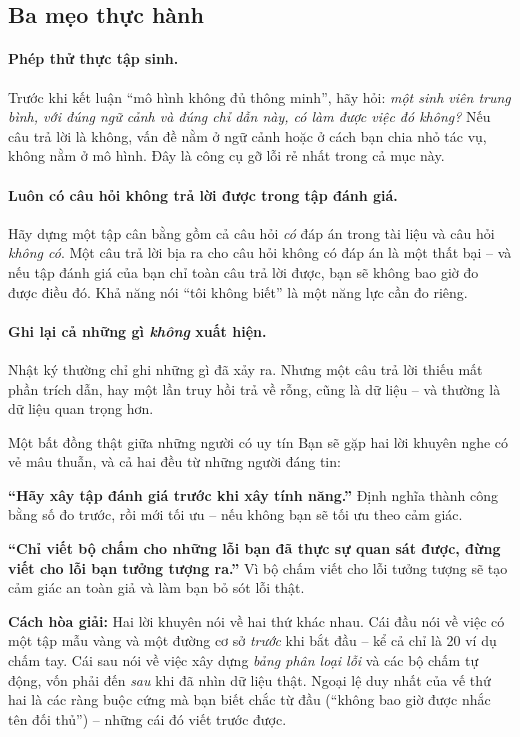 \subsection{Ba mẹo thực hành}
\label{ssec:eval_tips}

\paragraph{Phép thử thực tập sinh.} Trước khi kết luận “mô hình không đủ thông minh”, hãy hỏi: \emph{một sinh viên trung bình, với đúng ngữ cảnh và đúng chỉ dẫn này, có làm được việc đó không?} Nếu câu trả lời là không, vấn đề nằm ở ngữ cảnh hoặc ở cách bạn chia nhỏ tác vụ, không nằm ở mô hình. Đây là công cụ gỡ lỗi rẻ nhất trong cả mục này.

\paragraph{Luôn có câu hỏi không trả lời được trong tập đánh giá.} Hãy dựng một tập cân bằng gồm cả câu hỏi \emph{có} đáp án trong tài liệu và câu hỏi \emph{không có}. Một câu trả lời bịa ra cho câu hỏi không có đáp án là một thất bại -- và nếu tập đánh giá của bạn chỉ toàn câu trả lời được, bạn sẽ không bao giờ đo được điều đó. Khả năng nói “tôi không biết” là một năng lực cần đo riêng.

\paragraph{Ghi lại cả những gì \emph{không} xuất hiện.} Nhật ký thường chỉ ghi những gì đã xảy ra. Nhưng một câu trả lời thiếu mất phần trích dẫn, hay một lần truy hồi trả về rỗng, cũng là dữ liệu -- và thường là dữ liệu quan trọng hơn.

\begin{pitfall}{Một bất đồng thật giữa những người có uy tín}
Bạn sẽ gặp hai lời khuyên nghe có vẻ mâu thuẫn, và cả hai đều từ những người đáng tin:

\textbf{“Hãy xây tập đánh giá trước khi xây tính năng.”} Định nghĩa thành công bằng số đo trước, rồi mới tối ưu -- nếu không bạn sẽ tối ưu theo cảm giác.

\textbf{“Chỉ viết bộ chấm cho những lỗi bạn đã thực sự quan sát được, đừng viết cho lỗi bạn tưởng tượng ra.”} Vì bộ chấm viết cho lỗi tưởng tượng sẽ tạo cảm giác an toàn giả và làm bạn bỏ sót lỗi thật.

\textbf{Cách hòa giải:} Hai lời khuyên nói về hai thứ khác nhau. Cái đầu nói về việc có một tập mẫu vàng và một đường cơ sở \emph{trước} khi bắt đầu -- kể cả chỉ là 20 ví dụ chấm tay. Cái sau nói về việc xây dựng \emph{bảng phân loại lỗi} và các bộ chấm tự động, vốn phải đến \emph{sau} khi đã nhìn dữ liệu thật. Ngoại lệ duy nhất của vế thứ hai là các ràng buộc cứng mà bạn biết chắc từ đầu (“không bao giờ được nhắc tên đối thủ”) -- những cái đó viết trước được.
\end{pitfall}
